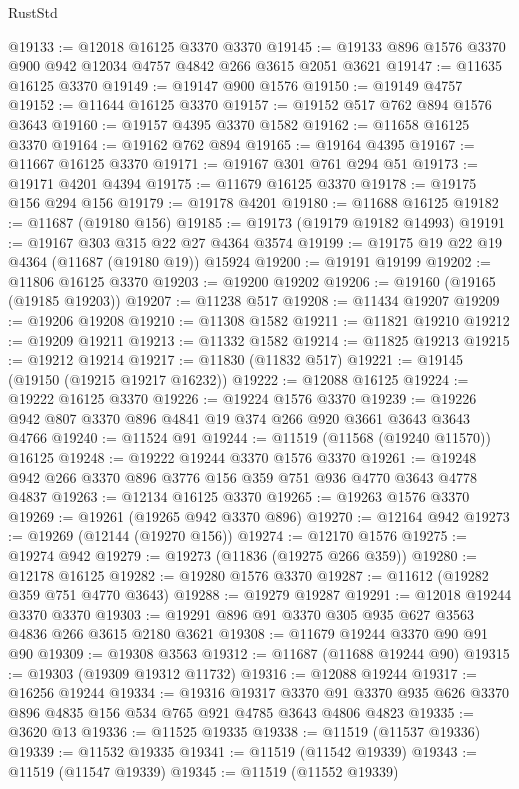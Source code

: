 \begin{lexlean}{RustStd}
\begin{coremodule}
@19133 := @12018 @16125 @3370 @3370
@19145 := @19133 @896 @1576 @3370 @900 @942 @12034 @4757 @4842 @266 @3615 @2051 @3621
@19147 := @11635 @16125 @3370
@19149 := @19147 @900 @1576
@19150 := @19149 @4757
@19152 := @11644 @16125 @3370
@19157 := @19152 @517 @762 @894 @1576 @3643
@19160 := @19157 @4395 @3370 @1582
@19162 := @11658 @16125 @3370
@19164 := @19162 @762 @894
@19165 := @19164 @4395
@19167 := @11667 @16125 @3370
@19171 := @19167 @301 @761 @294 @51
@19173 := @19171 @4201 @4394
@19175 := @11679 @16125 @3370
@19178 := @19175 @156 @294 @156
@19179 := @19178 @4201
@19180 := @11688 @16125
@19182 := @11687 (@19180 @156)
@19185 := @19173 (@19179 @19182 @14993)
@19191 := @19167 @303 @315 @22 @27 @4364 @3574
@19199 := @19175 @19 @22 @19 @4364 (@11687 (@19180 @19)) @15924
@19200 := @19191 @19199
@19202 := @11806 @16125 @3370
@19203 := @19200 @19202
@19206 := @19160 (@19165 (@19185 @19203))
@19207 := @11238 @517
@19208 := @11434 @19207
@19209 := @19206 @19208
@19210 := @11308 @1582
@19211 := @11821 @19210
@19212 := @19209 @19211
@19213 := @11332 @1582
@19214 := @11825 @19213
@19215 := @19212 @19214
@19217 := @11830 (@11832 @517)
@19221 := @19145 (@19150 (@19215 @19217 @16232))
@19222 := @12088 @16125
@19224 := @19222 @16125 @3370
@19226 := @19224 @1576 @3370
@19239 := @19226 @942 @807 @3370 @896 @4841 @19 @374 @266 @920 @3661 @3643 @3643 @4766
@19240 := @11524 @91
@19244 := @11519 (@11568 (@19240 @11570)) @16125
@19248 := @19222 @19244 @3370 @1576 @3370
@19261 := @19248 @942 @266 @3370 @896 @3776 @156 @359 @751 @936 @4770 @3643 @4778 @4837
@19263 := @12134 @16125 @3370
@19265 := @19263 @1576 @3370
@19269 := @19261 (@19265 @942 @3370 @896)
@19270 := @12164 @942
@19273 := @19269 (@12144 (@19270 @156))
@19274 := @12170 @1576
@19275 := @19274 @942
@19279 := @19273 (@11836 (@19275 @266 @359))
@19280 := @12178 @16125
@19282 := @19280 @1576 @3370
@19287 := @11612 (@19282 @359 @751 @4770 @3643)
@19288 := @19279 @19287
@19291 := @12018 @19244 @3370 @3370
@19303 := @19291 @896 @91 @3370 @305 @935 @627 @3563 @4836 @266 @3615 @2180 @3621
@19308 := @11679 @19244 @3370 @90 @91 @90
@19309 := @19308 @3563
@19312 := @11687 (@11688 @19244 @90)
@19315 := @19303 (@19309 @19312 @11732)
@19316 := @12088 @19244
@19317 := @16256 @19244
@19334 := @19316
    @19317
    @3370
    @91
    @3370
    @935
    @626
    @3370
    @896
    @4835
    @156
    @534
    @765
    @921
    @4785
    @3643
    @4806
    @4823
@19335 := @3620 @13
@19336 := @11525 @19335
@19338 := @11519 (@11537 @19336)
@19339 := @11532 @19335
@19341 := @11519 (@11542 @19339)
@19343 := @11519 (@11547 @19339)
@19345 := @11519 (@11552 @19339)

\end{coremodule}
\end{lexlean}
